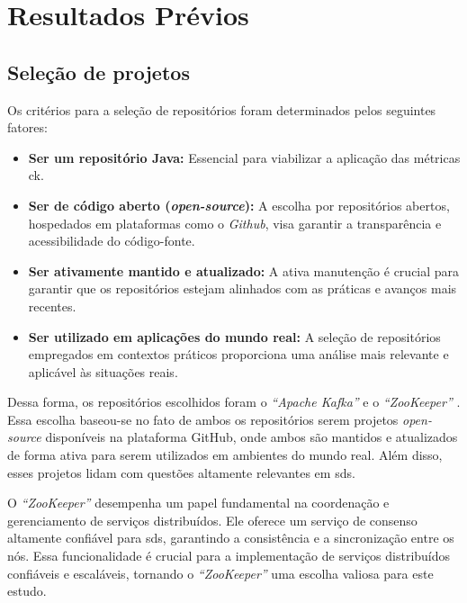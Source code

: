 \chapter{Resultados Prévios}
\label{cap:resultados}

\section{Seleção de projetos}

Os critérios para a seleção de repositórios foram determinados pelos seguintes fatores:

\begin{itemize}
    \item \textbf{Ser um repositório Java:} Essencial para viabilizar a aplicação das métricas \gls{ck}.
    \item \textbf{Ser de código aberto (\textit{open-source}):} A escolha por repositórios abertos, hospedados em plataformas como o \textit{Github}, visa garantir a transparência e acessibilidade do código-fonte.
    \item \textbf{Ser ativamente mantido e atualizado:} A ativa manutenção é crucial para garantir que os repositórios estejam alinhados com as práticas e avanços mais recentes.
    \item \textbf{Ser utilizado em aplicações do mundo real:} A seleção de repositórios empregados em contextos práticos proporciona uma análise mais relevante e aplicável às situações reais.
\end{itemize}

Dessa forma, os repositórios escolhidos foram o \textit{``Apache Kafka''} \cite{KafkaGitHub} e o \textit{``ZooKeeper''} \cite{ZookeeperGitHub}. Essa escolha baseou-se no fato de ambos os repositórios serem projetos \textit{open-source} disponíveis na plataforma GitHub, onde ambos são mantidos e atualizados de forma ativa para serem utilizados em ambientes do mundo real. Além disso, esses projetos lidam com questões altamente relevantes em \gls{sds}.

O \textit{``ZooKeeper''} desempenha um papel fundamental na coordenação e gerenciamento de serviços distribuídos. Ele oferece um serviço de consenso altamente confiável para \gls{sds}, garantindo a consistência e a sincronização entre os nós. Essa funcionalidade é crucial para a implementação de serviços distribuídos confiáveis e escaláveis, tornando o \textit{``ZooKeeper''} uma escolha valiosa para este estudo.

